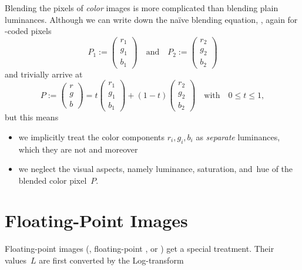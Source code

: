 Blending the pixels of \emph{color} images is more complicated than
blending plain luminances.  Although we can write down the na\"ive
blending equation, , again for
-coded pixels
\[
  P_1 := \left(\begin{array}{c}r_1\\ g_1\\ b_1\end{array}\right)
  \quad \mbox{and}\quad
  P_2 := \left(\begin{array}{c}r_2\\ g_2\\ b_2\end{array}\right)
\]
and trivially arrive at
\begin{equation}\label{equ:trivial-rgb-blend}
  P :=
  \left(\begin{array}{c}r\\ g\\ b\end{array}\right) =
    t \left(\begin{array}{c}r_1\\ g_1\\ b_1\end{array}\right) +
    (1 - t) \left(\begin{array}{c}r_2\\ g_2\\ b_2\end{array}\right)
    \quad \mbox{with} \quad 0 \leq t \leq 1,
\end{equation}
but this means
\begin{itemize}
\item
  we implicitly treat the color components $r_i, g_i, b_i$ as
  \emph{separate} luminances, which they are not and moreover

\item
  we neglect the visual aspects, namely luminance, saturation, and~hue
  of the blended color pixel~$P$.
\end{itemize}


\section[Floating-Point Images]{Floating-Point Images
  \label{sec:floating-point-images}
  }

Floating-point images
(,%
floating-point ,%
%
or %
%
)
get a special treatment.  Their values~$L$ are first converted by the
Log-transform

